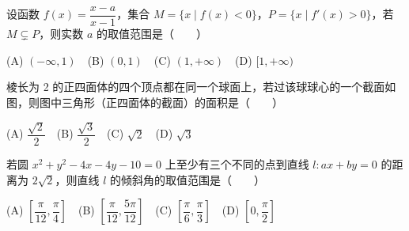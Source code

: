 \begin{question}
设函数 $f(x)=\dfrac{x-a}{x-1}$，集合 $M=\{x\mid f(x)<0\}$，$P=\{x\mid f'(x)>0\}$，若 $M\subsetneq P$，则实数 $a$ 的取值范围是\mbox{（　　）}

(A) $(-\infty,1)$　(B) $(0,1)$　(C) $(1,+\infty)$　(D) $[1,+\infty)$

\Needspace{0.4\textheight}
\end{question}
\begin{question}
棱长为 2 的正四面体的四个顶点都在同一个球面上，若过该球球心的一个截面如图，则图中三角形（正四面体的截面）的面积是\mbox{（　　）}
\nopagebreak[4]
\begin{center}\end{center}
\nopagebreak[4]
(A) $\dfrac{\sqrt2}{2}$　(B) $\dfrac{\sqrt3}{2}$　(C) $\sqrt2$　(D) $\sqrt3$

\end{question}
\begin{question}
若圆 $x^2+y^2-4x-4y-10=0$ 上至少有三个不同的点到直线 $l:ax+by=0$ 的距离为 $2\sqrt2$，则直线 $l$ 的倾斜角的取值范围是\mbox{（　　）}

(A) $\left[\dfrac\pi{12},\dfrac\pi4\right]$　(B) $\left[\dfrac\pi{12},\dfrac{5\pi}{12}\right]$　(C) $\left[\dfrac\pi6,\dfrac\pi3\right]$　(D) $\left[0,\dfrac\pi2\right]$

\end{question}

